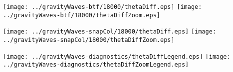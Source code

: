 \documentclass{article}
\begin{document}
\texttt{[image: ../gravityWaves-btf/18000/thetaDiff.eps]}
\hspace{0.1in}
\texttt{[image: ../gravityWaves-btf/18000/thetaDiffZoom.eps]}
\vspace*{0.1in}

\texttt{[image: ../gravityWaves-snapCol/18000/thetaDiff.eps]}
\hspace{0.1in}
\texttt{[image: ../gravityWaves-snapCol/18000/thetaDiffZoom.eps]}
\vspace*{0.1in}

\texttt{[image: ../gravityWaves-diagnostics/thetaDiffLegend.eps]}
\hspace{0.2in}
\texttt{[image: ../gravityWaves-diagnostics/thetaDiffZoomLegend.eps]}
\end{document}
